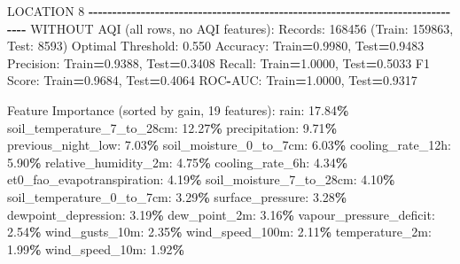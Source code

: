 \documentclass[
  letterpaper,
  DIV=11,
  numbers=noendperiod]{scrartcl}
\newenvironment{Shaded}{\begin{snugshade}}{\end{snugshade}}
\newcommand{\BuiltInTok}[1]{#1}
\newcommand{\DecValTok}[1]{\textcolor[rgb]{0.00,0.00,0.81}{#1}}
\newcommand{\FloatTok}[1]{\textcolor[rgb]{0.00,0.00,0.81}{#1}}
\newcommand{\NormalTok}[1]{#1}
\newcommand{\OperatorTok}[1]{\textcolor[rgb]{0.81,0.36,0.00}{\textbf{#1}}}
\begin{document}
\begin{Shaded}
\begin{Highlighting}[]
\NormalTok{LOCATION }\DecValTok{8}
\OperatorTok{{-}{-}{-}{-}{-}{-}{-}{-}{-}{-}{-}{-}{-}{-}{-}{-}{-}{-}{-}{-}{-}{-}{-}{-}{-}{-}{-}{-}{-}{-}{-}{-}{-}{-}{-}{-}{-}{-}{-}{-}{-}{-}{-}{-}{-}{-}{-}{-}{-}{-}{-}{-}{-}{-}{-}{-}{-}{-}{-}{-}{-}{-}{-}{-}{-}{-}{-}{-}{-}{-}{-}{-}{-}{-}{-}{-}{-}{-}{-}{-}}
\NormalTok{WITHOUT AQI (}\BuiltInTok{all}\NormalTok{ rows, no AQI features):}
\NormalTok{  Records: }\DecValTok{168456}\NormalTok{ (Train: }\DecValTok{159863}\NormalTok{, Test: }\DecValTok{8593}\NormalTok{)}
\NormalTok{  Optimal Threshold: }\FloatTok{0.550}
\NormalTok{  Accuracy: Train}\OperatorTok{=}\FloatTok{0.9980}\NormalTok{, Test}\OperatorTok{=}\FloatTok{0.9483}
\NormalTok{  Precision: Train}\OperatorTok{=}\FloatTok{0.9388}\NormalTok{, Test}\OperatorTok{=}\FloatTok{0.3408}
\NormalTok{  Recall: Train}\OperatorTok{=}\FloatTok{1.0000}\NormalTok{, Test}\OperatorTok{=}\FloatTok{0.5033}
\NormalTok{  F1 Score: Train}\OperatorTok{=}\FloatTok{0.9684}\NormalTok{, Test}\OperatorTok{=}\FloatTok{0.4064}
\NormalTok{  ROC}\OperatorTok{{-}}\NormalTok{AUC: Train}\OperatorTok{=}\FloatTok{1.0000}\NormalTok{, Test}\OperatorTok{=}\FloatTok{0.9317}

\NormalTok{  Feature Importance (}\BuiltInTok{sorted}\NormalTok{ by gain, }\DecValTok{19}\NormalTok{ features):}
\NormalTok{    rain: }\FloatTok{17.84}\OperatorTok{\%}
\NormalTok{    soil\_temperature\_7\_to\_28cm: }\FloatTok{12.27}\OperatorTok{\%}
\NormalTok{    precipitation: }\FloatTok{9.71}\OperatorTok{\%}
\NormalTok{    previous\_night\_low: }\FloatTok{7.03}\OperatorTok{\%}
\NormalTok{    soil\_moisture\_0\_to\_7cm: }\FloatTok{6.03}\OperatorTok{\%}
\NormalTok{    cooling\_rate\_12h: }\FloatTok{5.90}\OperatorTok{\%}
\NormalTok{    relative\_humidity\_2m: }\FloatTok{4.75}\OperatorTok{\%}
\NormalTok{    cooling\_rate\_6h: }\FloatTok{4.34}\OperatorTok{\%}
\NormalTok{    et0\_fao\_evapotranspiration: }\FloatTok{4.19}\OperatorTok{\%}
\NormalTok{    soil\_moisture\_7\_to\_28cm: }\FloatTok{4.10}\OperatorTok{\%}
\NormalTok{    soil\_temperature\_0\_to\_7cm: }\FloatTok{3.29}\OperatorTok{\%}
\NormalTok{    surface\_pressure: }\FloatTok{3.28}\OperatorTok{\%}
\NormalTok{    dewpoint\_depression: }\FloatTok{3.19}\OperatorTok{\%}
\NormalTok{    dew\_point\_2m: }\FloatTok{3.16}\OperatorTok{\%}
\NormalTok{    vapour\_pressure\_deficit: }\FloatTok{2.54}\OperatorTok{\%}
\NormalTok{    wind\_gusts\_10m: }\FloatTok{2.35}\OperatorTok{\%}
\NormalTok{    wind\_speed\_100m: }\FloatTok{2.11}\OperatorTok{\%}
\NormalTok{    temperature\_2m: }\FloatTok{1.99}\OperatorTok{\%}
\NormalTok{    wind\_speed\_10m: }\FloatTok{1.92}\OperatorTok{\%}


\end{Highlighting}
\end{Shaded}
\end{document}
